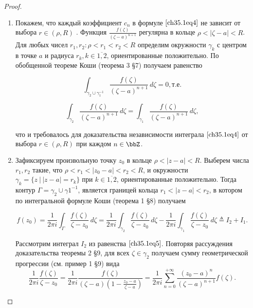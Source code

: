 \begin{proof}


\begin{enumerate}
\item
Покажем, что каждый коэффициент $c_n$ в формуле $\eqref{ch35.1eq4}$ не зависит от выбора $r \in (\rho, R)$ . Функция $\frac{f(\zeta)}{(\zeta - a)^{n+1}}$ регулярна в кольце $\rho < |\zeta - a| < R$. Для любых чисел $r_1, r_2: \rho < r_1 < r_2 < R$ определим окружности $\gamma_k$ с центром в точке $a$ и радиуса $r_k, k \in \overline{1,2}$, ориентированные положительно. По обобщенной теореме Коши (теорема 3 \S 7) получаем равенство

$$
\int_{\gamma_2 \cup \gamma_{1}^{-1}} \frac{f(\zeta)}{(\zeta - a)^{n + 1}} \,d\zeta = 0, \text{т.е.}
$$

$$
\int_{\gamma_2} \frac{f(\zeta)}{(\zeta - a)^{n + 1}} \,d\zeta = \int_{\gamma_1} \frac{f(\zeta)}{(\zeta - a)^{n + 1}} \,d\zeta,
$$

что и требовалось для доказательства независимости интеграла $\eqref{ch35.1eq4}$ от выбора $r \in (\rho, R)$ при каждом $n \in \bbZ$.

\item

Зафиксируем произвольную точку $z_0$ в кольце $\rho < |z - a| < R$. Выберем числа $r_1, r_2$ такие, что 
$\rho < r_1 < |z_0 - a| < r_2 < R$, и окружности $\gamma_k = \{ z \: \big| \: |z - a| = r_k\}$ при $k \in \overline{1,2}$, ориентированные положительно. Тогда контур $\Gamma = \gamma_2 \cup \gamma{1}^{-1}$, является границей кольца $r_1 < |z - a| < r_2$, в котором по интегральной формуле Коши (теорема 1 \S8) получаем

\begin{equation} \label{ch35.1eq5}
f(z_0) = \frac{1}{2\pi i} \int_\Gamma \frac{f(\zeta)}{\zeta - z_0} \,d\zeta = \frac{1}{2\pi i} \int_{\gamma_2} \frac{f(\zeta)}{\zeta - z_0} \,d\zeta - \frac{1}{2\pi i} \int_{\gamma_1} \frac{f(\zeta)}{\zeta - z_0} \,d\zeta \triangleq I_2 + I_1.
\end{equation}

Рассмотрим интеграл $I_2$ из равенства $\eqref{ch35.1eq5}$. Повторяя рассуждения доказательства теоремы 2 \S 9, для всех $\zeta \in \gamma_2$ получаем сумму геометрической прогрессии (см. пример 1 \S 9) вида
\begin{equation} \label{ch35.1eq6}
\frac{1}{2\pi i} \frac{f(\zeta)}{\zeta - z_0} = \frac{1}{2\pi i} \frac{f(\zeta)}{(\zeta - a) \left( 1 - \frac{z_0 - a}{\zeta - a}\right)} = \frac{1}{2\pi i}\sum\limits_{n = 0}^{+\infty} \frac{(z_0 - a)^n}{(\zeta - a)^{n + 1}} f(\zeta).
\end{equation}


\end{enumerate}
\end{proof}
